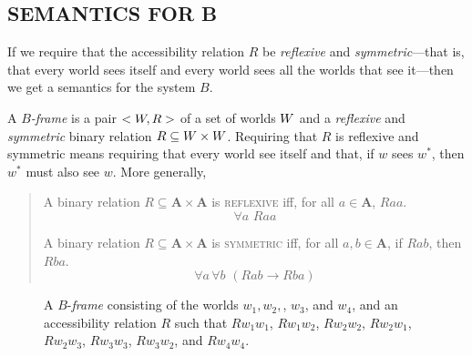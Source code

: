 \documentclass[landscape, two column, full page,reqno]{article}
\let\mathcal\relax
\newcommand{\mathcal}{\OMScal}%
\newcommand{\qd}{\begin{quote}\begin{description}  [align=left,style=nextline,leftmargin=*,labelsep=0pt,font=\normalfont]}
\newcommand{\zd}{\end{description}\end{quote}}
\newcommand{\p}{\item}
\newcommand{\e}{\emph}
\newcommand{\mbf}{\mathbf}
\newcommand{\s}{\textsc}
\newcommand{\fns}[1]{{\footnotesize #1}}
\newcommand{\hs}{\hspace{2pt}}
\begin{document}
\subsection{S\fns{EMANTICS} F\fns{OR} B}

If we require that the accessibility relation $R$ be \e{reflexive} and \e{symmetric}---that is, that every world sees itself and every world sees all the worlds that see it---then we get a semantics for the system $B$.

\p A \e{$B$-frame} is a pair $< \mathcal{W}, R >$ of a set of worlds $\mathcal{W}$ and a \e{reflexive} and \e{symmetric} binary relation $R \subseteq \mathcal{W} \times \mathcal{W}$.  Requiring that $R$ is reflexive and symmetric means requiring that every world see itself and that, if $w$ sees $w^*$, then $w^*$ must also see $w$.  More generally,
	\qd
	\p[\s{reflexivity}] A binary relation $R \subseteq \mbf{A} \times \mbf{A}$ is \s{reflexive} iff, for all $a \in \mbf{A}$, $Raa$.
		\[
		\forall a \hs\hs Raa
		\]
	\p[\s{symmetry}] A binary relation $R \subseteq \mbf{A} \times \mbf{A}$ is \s{symmetric} iff, for all $a, b \in \mbf{A}$, if $Rab$, then $Rba$.
		\[
		\forall a \hs \forall b \hs\hs (R ab \to Rba)
		\]
	\zd
	
\begin{figure}[t]
\centering
{}

\caption{\small A $B$-\e{frame} consisting of the worlds $w_1, w_2,$,  $w_3$, and $w_4$, and an accessibility relation $R$ such that $R w_1  w_1$, $Rw_1w_2$, $R w_2 w_2$, $R w_2 w_1$, $Rw_2w_3$, $R w_3  w_3$, $Rw_3w_2$, and $Rw_4w_4$.}\label{fig:frame4}
\end{figure}
\end{document}
